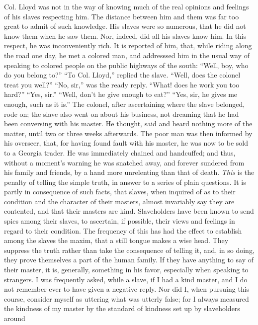 Col. Lloyd was not in the way of knowing much of the real opinions and
feelings of his slaves respecting him. The distance between him and them
was far too great to admit of such knowledge. His slaves were so
numerous, that he did not know them when he saw them. Nor, indeed, did
all his slaves know him. In this respect, he was inconveniently rich. It
is reported of him, that, while riding along the road one day, he met a
colored man, and {addresssed} him in the usual way of speaking to
colored people on the public highways of the south: ``Well, boy, who do
you belong to?'' ``To Col. Lloyd,'' replied the slave. ``Well, does the
colonel treat you well?'' ``No, sir,'' was the ready reply. ``What! does
he work you too hard?'' ``Yes, sir.'' ``Well, don't he give enough to
eat?'' ``Yes, sir, he gives me enough, such as it is.'' The colonel,
after ascertaining where the slave belonged, rode on; the slave
{\protect\hypertarget{117}{}{}}also went on about his business, not
dreaming that he had been conversing with his master. He thought, said
and heard nothing more of the matter, until two or three weeks
afterwards. The poor man was then informed by his overseer, that, for
having found fault with his master, he was now to be sold to a Georgia
trader. He was immediately chained and handcuffed; and thus, without a
moment's warning he was snatched away, and forever sundered from his
family and friends, by a hand more unrelenting than that of death.
\emph{This} is the penalty of telling the simple truth, in answer to a
series of plain questions. It is partly in consequence of such facts,
that slaves, when inquired of as to their condition and the character of
their masters, almost invariably say they are contented, and that their
masters are kind. Slaveholders have been known to send spies among their
slaves, to ascertain, if possible, their views and feelings in regard to
their condition. The frequency of this has had the effect to establish
among the slaves the maxim, that a still tongue makes a wise head. They
suppress the truth rather than take the consequence of telling it, and,
in so doing, they prove themselves a part of the human family. If they
have anything to say of their master, it is, generally, something in his
favor, especially when speaking to strangers. I was frequently asked,
while a slave, if I had a kind master, and I do not remember ever to
have given a negative reply. Nor did I, when pursuing this course,
consider myself as uttering what was utterly false; for I always
measured the kindness of my master by the standard of
{\protect\hypertarget{118}{}{}}kindness set up by slaveholders around
